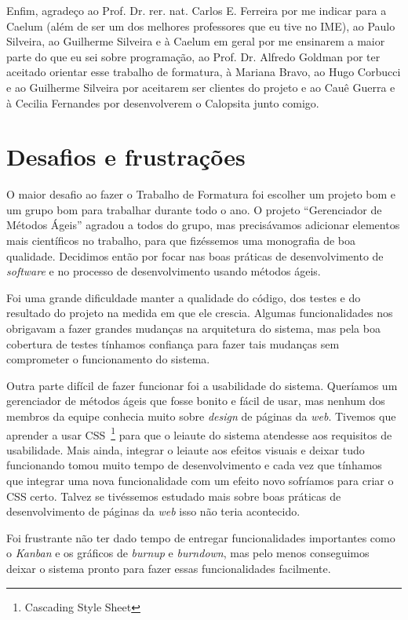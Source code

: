 \documentclass[titlepage,a4paper]{article}
\newcommand{\software}{\textit{software}}
\newcommand{\calopsita}{Calopsita}
\begin{document}
Enfim, agradeço ao Prof. Dr. rer. nat. Carlos E. Ferreira por me indicar para a Caelum (além de ser um dos melhores professores que eu tive no IME), ao Paulo Silveira, ao Guilherme Silveira e à Caelum em geral por me ensinarem a maior parte do que eu sei sobre programação, ao Prof. Dr. Alfredo Goldman por ter aceitado orientar esse trabalho de formatura, à Mariana Bravo, ao Hugo Corbucci e ao Guilherme Silveira por aceitarem ser clientes do projeto e ao Cauê Guerra e à Cecilia Fernandes por desenvolverem o \calopsita{} junto comigo.

\section{Desafios e frustrações}

O maior desafio ao fazer o Trabalho de Formatura foi escolher um projeto bom e um grupo bom para trabalhar durante todo o ano. O projeto ``Gerenciador de Métodos Ágeis'' agradou a todos do grupo, mas precisávamos adicionar elementos mais científicos no trabalho, para que fizéssemos uma monografia de boa qualidade. Decidimos então por focar nas boas práticas de desenvolvimento de \software{} e no processo de desenvolvimento usando métodos ágeis.

Foi uma grande dificuldade manter a qualidade do código, dos testes e do resultado do projeto na medida em que ele crescia. Algumas funcionalidades nos obrigavam a fazer grandes mudanças na arquitetura do sistema, mas pela boa cobertura de testes tínhamos confiança para fazer tais mudanças sem comprometer o funcionamento do sistema.

Outra parte difícil de fazer funcionar foi a usabilidade do sistema. Queríamos um gerenciador de métodos ágeis que fosse bonito e fácil de usar, mas nenhum dos membros da equipe conhecia muito sobre \textit{design} de páginas da \textit{web}. Tivemos que aprender a usar CSS~\footnote{Cascading Style Sheet} para que o leiaute do sistema atendesse aos requisitos de usabilidade. Mais ainda, integrar o leiaute aos efeitos visuais e deixar tudo funcionando tomou muito tempo de desenvolvimento e cada vez que tínhamos que integrar uma nova funcionalidade com um efeito novo sofríamos para criar o CSS certo. Talvez se tivéssemos estudado mais sobre boas práticas de desenvolvimento de páginas da \textit{web} isso não teria acontecido.

Foi frustrante não ter dado tempo de entregar funcionalidades importantes como o \textit{Kanban} e os gráficos de \textit{burnup} e \textit{burndown}, mas pelo menos conseguimos deixar o sistema pronto para fazer essas funcionalidades facilmente.
\end{document}
